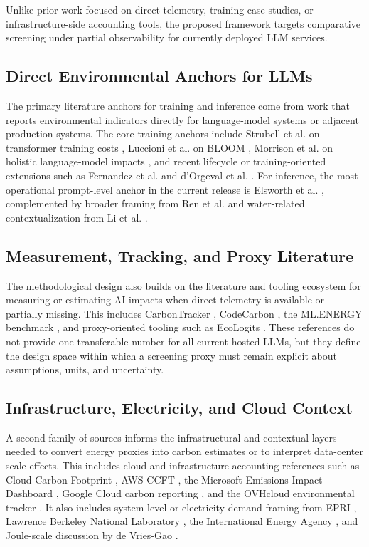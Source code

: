 \documentclass[runningheads]{llncs}
\begin{document}
\par Unlike prior work focused on direct telemetry, training case studies, or infrastructure-side accounting tools, the proposed framework targets comparative screening under partial observability for currently deployed LLM services.

\subsection{Direct Environmental Anchors for LLMs}
The primary literature anchors for training and inference come from work that reports environmental indicators directly for language-model systems or adjacent production systems. The core training anchors include Strubell et al. on transformer training costs \cite{strubell2019}, Luccioni et al. on BLOOM \cite{luccioni2023}, Morrison et al. on holistic language-model impacts \cite{morrison2025}, and recent lifecycle or training-oriented extensions such as Fernandez et al. \cite{fernandez2025lca} and d'Orgeval et al. \cite{dorgeval2026}. For inference, the most operational prompt-level anchor in the current release is Elsworth et al. \cite{elsworth2025}, complemented by broader framing from Ren et al. \cite{ren2024} and water-related contextualization from Li et al. \cite{li2025water}.

\subsection{Measurement, Tracking, and Proxy Literature}
The methodological design also builds on the literature and tooling ecosystem for measuring or estimating AI impacts when direct telemetry is available or partially missing. This includes CarbonTracker \cite{anthony2020carbontracker}, CodeCarbon \cite{codecarbon2026}, the ML.ENERGY benchmark \cite{mlenergy2025}, and proxy-oriented tooling such as EcoLogits \cite{ecologits2026}. These references do not provide one transferable number for all current hosted LLMs, but they define the design space within which a screening proxy must remain explicit about assumptions, units, and uncertainty.

\subsection{Infrastructure, Electricity, and Cloud Context}
A second family of sources informs the infrastructural and contextual layers needed to convert energy proxies into carbon estimates or to interpret data-center scale effects. This includes cloud and infrastructure accounting references such as Cloud Carbon Footprint \cite{cloudcarbonfootprint2026}, AWS CCFT \cite{awsccft2026}, the Microsoft Emissions Impact Dashboard \cite{azureeid2026}, Google Cloud carbon reporting \cite{gcloudcarbon2026}, and the OVHcloud environmental tracker \cite{ovhtracker2024}. It also includes system-level or electricity-demand framing from EPRI \cite{epri2024}, Lawrence Berkeley National Laboratory \cite{lbl2025,shehabi2024report}, the International Energy Agency \cite{iea2025}, and Joule-scale discussion by de Vries-Gao \cite{devriesgao2025joule}.
\end{document}
